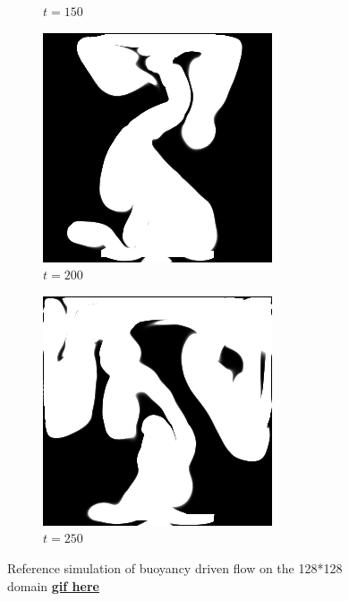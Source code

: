 \documentclass[a4paper,12pt,twoside]{report}
\begin{document}
\begin{figure}
\begin{subfigure}{0.18\textwidth}
		\caption{$t=150$}
	\end{subfigure}
	\begin{subfigure}{0.18\textwidth}
		\centering
		\includegraphics[scale=0.28]{buoyancy_test/dens_000200_ref.png}
		\caption{$t=200$}
	\end{subfigure}
	\begin{subfigure}{0.18\textwidth}
		\centering
		\includegraphics[scale=0.28]{buoyancy_test/dens_000249_ref.png}
		\caption{$t=250$}
	\end{subfigure}
	\caption{Reference simulation of buoyancy driven flow on the 128*128 domain \href{https://github.com/w191444052/sol-data/blob/master/buoyancy_high/ref.gif}{\bf{gif here}}}
	\label{sol buoyancy high ref}
\end{figure}
\end{document}
